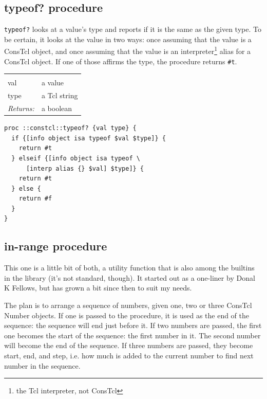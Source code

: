 \documentclass[twoside]{report}
\begin{document}
\subsection{typeof? procedure}
\label{typeof-procedure}

\texttt{typeof?} looks at a value's type and reports if it is the same as the given type. To be certain, it looks at the value in two ways: once assuming that the value is a ConsTcl object, and once assuming that the value is an interpreter\footnote{the Tcl interpreter, not ConsTcl} alias for a ConsTcl object. If one of those affirms the type, the procedure returns \texttt{\#t}.

\noindent\begin{tabular}{ |p{1.9cm} p{8cm}| }
\hline
\rowcolor[HTML]{CCCCCC} \multicolumn{2}{|l|}{\bf typeof? (internal)} \\
val & a value \\
type & a Tcl string \\
\textit{Returns:} & a boolean \\
\hline
\end{tabular}

\begin{lstlisting}
proc ::constcl::typeof? {val type} {
  if {[info object isa typeof $val $type]} {
    return #t
  } elseif {[info object isa typeof \
      [interp alias {} $val] $type]} {
    return #t
  } else {
    return #f
  }
}
\end{lstlisting}

\subsection{in-range procedure}
\label{inrange-procedure}

This one is a little bit of both, a utility function that is also among the builtins in the library (it's not standard, though). It started out as a one-liner by Donal K Fellows, but has grown a bit since then to suit my needs.

The plan is to arrange a sequence of numbers, given one, two or three ConsTcl Number objects. If one is passed to the procedure, it is used as the end of the sequence: the sequence will end just before it. If two numbers are passed, the first one becomes the start of the sequence: the first number in it. The second number will become the end of the sequence. If three numbers are passed, they become start, end, and step, i.e. how much is added to the current number to find next number in the sequence.
\end{document}
